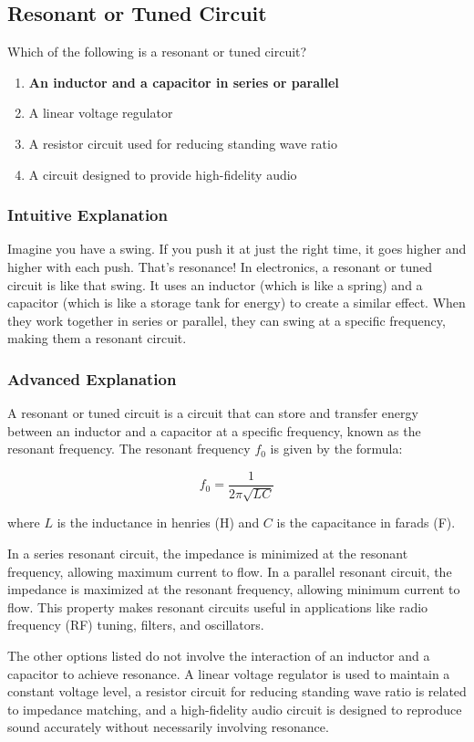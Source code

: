 \subsection{Resonant or Tuned Circuit}
\label{T6D11}

\begin{tcolorbox}[colback=gray!10!white,colframe=black!75!black,title=T6D11]
Which of the following is a resonant or tuned circuit?
\begin{enumerate}[label=\Alph*)]
    \item \textbf{An inductor and a capacitor in series or parallel}
    \item A linear voltage regulator
    \item A resistor circuit used for reducing standing wave ratio
    \item A circuit designed to provide high-fidelity audio
\end{enumerate}
\end{tcolorbox}

\subsubsection{Intuitive Explanation}
Imagine you have a swing. If you push it at just the right time, it goes higher and higher with each push. That's resonance! In electronics, a resonant or tuned circuit is like that swing. It uses an inductor (which is like a spring) and a capacitor (which is like a storage tank for energy) to create a similar effect. When they work together in series or parallel, they can swing at a specific frequency, making them a resonant circuit.

\subsubsection{Advanced Explanation}
A resonant or tuned circuit is a circuit that can store and transfer energy between an inductor and a capacitor at a specific frequency, known as the resonant frequency. The resonant frequency \( f_0 \) is given by the formula:

\[
f_0 = \frac{1}{2\pi\sqrt{LC}}
\]

where \( L \) is the inductance in henries (H) and \( C \) is the capacitance in farads (F). 

In a series resonant circuit, the impedance is minimized at the resonant frequency, allowing maximum current to flow. In a parallel resonant circuit, the impedance is maximized at the resonant frequency, allowing minimum current to flow. This property makes resonant circuits useful in applications like radio frequency (RF) tuning, filters, and oscillators.

The other options listed do not involve the interaction of an inductor and a capacitor to achieve resonance. A linear voltage regulator is used to maintain a constant voltage level, a resistor circuit for reducing standing wave ratio is related to impedance matching, and a high-fidelity audio circuit is designed to reproduce sound accurately without necessarily involving resonance.

